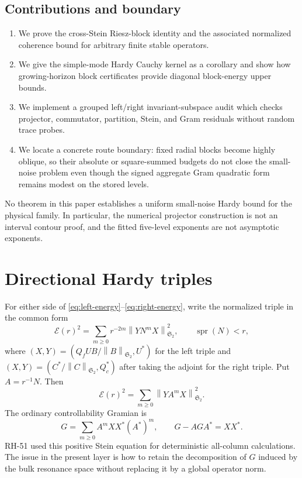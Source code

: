 \documentclass[11pt]{article}
\theoremstyle{remark}
\newcommand{\norm}[1]{\left\lVert#1\right\rVert}
\newcommand{\HS}{\mathfrak S_2}
\newcommand{\cE}{\mathcal E}
\newcommand{\spr}{\operatorname{spr}}
\begin{document}
\subsection*{Contributions and boundary}

\begin{enumerate}[leftmargin=2.2em]
 \item We prove the cross-Stein Riesz-block identity and the associated
       normalized coherence bound for arbitrary finite stable operators.
 \item We give the simple-mode Hardy Cauchy kernel as a corollary and show
       how growing-horizon block certificates provide diagonal block-energy
       upper bounds.
 \item We implement a grouped left/right invariant-subspace audit which
       checks projector, commutator, partition, Stein, and Gram residuals
       without random trace probes.
 \item We locate a concrete route boundary: fixed radial blocks become highly
       oblique, so their absolute or square-summed budgets do not close the
       small-noise problem even though the signed aggregate Gram quadratic
       form remains modest on the stored levels.
\end{enumerate}

No theorem in this paper establishes a uniform small-noise Hardy bound for
the physical family.  In particular, the numerical projector construction is
not an interval contour proof, and the fitted five-level exponents are not
asymptotic exponents.

\section{Directional Hardy triples}
\label{sec:triples}

For either side of \eqref{eq:left-energy}--\eqref{eq:right-energy}, write the
normalized triple in the common form
\begin{equation}
 \cE(r)^2=\sum_{m\ge0}r^{-2m}\norm{YN^mX}_{\HS}^2,
 \qquad \spr(N)<r,
 \label{eq:common-energy}
\end{equation}
where $(X,Y)=(Q_fUB/\norm B_{\HS},U^*)$ for the left triple and
$(X,Y)=(C^*/\norm C_{\HS},Q_c^*)$ after taking the adjoint for the right
triple.  Put $A=r^{-1}N$.  Then
\begin{equation}
 \cE(r)^2=\sum_{m\ge0}\norm{YA^mX}_{\HS}^2.
 \label{eq:scaled-energy}
\end{equation}
The ordinary controllability Gramian is
\begin{equation}
 G=\sum_{m\ge0}A^mXX^*(A^*)^m,
 \qquad G-AGA^*=XX^*.
 \label{eq:gramian}
\end{equation}
RH-51 used this positive Stein equation for deterministic all-column
calculations.  The issue in the present layer is how to retain the
decomposition of $G$ induced by the bulk resonance space without replacing it
by a global operator norm.
\end{document}
